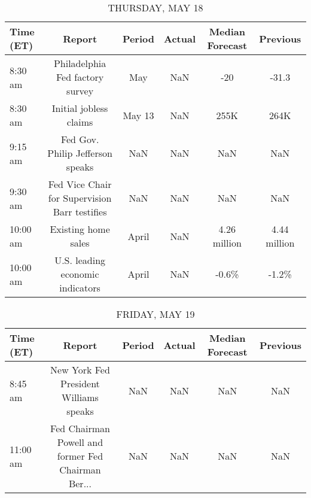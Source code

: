 \documentclass{article}%
\begin{document}
%


\begin{table}[htbp]%
\caption{THURSDAY, MAY 18}%
\centering%
\begin{adjustbox}{width=1\textwidth}%
\begin{tabular}{lccccc}
\toprule
Time (ET) &                                        Report & Period & Actual & Median Forecast &     Previous \\
\midrule
  8:30 am &               Philadelphia Fed factory survey &    May &    NaN &             -20 &        -31.3 \\
  8:30 am &                        Initial jobless claims & May 13 &    NaN &            255K &         264K \\
  9:15 am &              Fed Gov. Philip Jefferson speaks &    NaN &    NaN &             NaN &          NaN \\
  9:30 am & Fed Vice Chair for Supervision Barr testifies &    NaN &    NaN &             NaN &          NaN \\
 10:00 am &                           Existing home sales &  April &    NaN &    4.26 million & 4.44 million \\
 10:00 am &              U.S. leading economic indicators &  April &    NaN &           -0.6\% &        -1.2\% \\
\bottomrule
\end{tabular}
%
\end{adjustbox}%
\end{table}

%


\begin{table}[htbp]%
\caption{FRIDAY, MAY 19}%
\centering%
\begin{adjustbox}{width=1\textwidth}%
\begin{tabular}{lccccc}
\toprule
Time (ET) &                                             Report & Period & Actual & Median Forecast & Previous \\
\midrule
  8:45 am &             New York Fed President Williams speaks &    NaN &    NaN &             NaN &      NaN \\
 11:00 am & Fed Chairman Powell and former Fed Chairman Ber... &    NaN &    NaN &             NaN &      NaN \\
\bottomrule
\end{tabular}
%
\end{adjustbox}%
\end{table}
\end{document}
